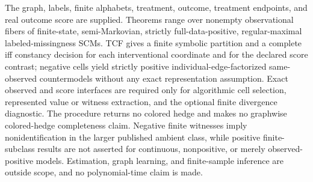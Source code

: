 \documentclass{article}
\begin{document}
The graph, labels, finite alphabets, treatment, outcome, treatment endpoints, and real outcome score are supplied. Theorems range over nonempty observational fibers of finite-state, semi-Markovian, strictly full-data-positive, regular-maximal labeled-missingness SCMs. TCF gives a finite symbolic partition and a complete iff constancy decision for each interventional coordinate and for the declared score contrast; negative cells yield strictly positive individual-edge-factorized same-observed countermodels without any exact representation assumption. Exact observed and score interfaces are required only for algorithmic cell selection, represented value or witness extraction, and the optional finite divergence diagnostic. The procedure returns no colored hedge and makes no graphwise colored-hedge completeness claim. Negative finite witnesses imply nonidentification in the larger published ambient class, while positive finite-subclass results are not asserted for continuous, nonpositive, or merely observed-positive models. Estimation, graph learning, and finite-sample inference are outside scope, and no polynomial-time claim is made.
\end{document}
